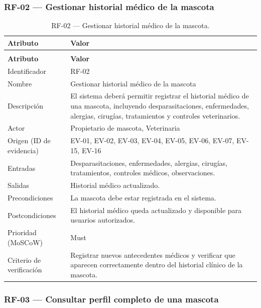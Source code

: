 \documentclass[journal,onecolumn]{IEEEtran}
\makeatletter
\newenvironment{atributos}[2]{%
	\small
	\begin{longtable}{@{}>{\raggedright\arraybackslash}p{4.2cm} >{\raggedright\arraybackslash}p{11.2cm}@{}}
		\caption{#2}\label{tab:#1}\\
		\toprule
		\textbf{Atributo} & \textbf{Valor} \\
		\midrule
		\endfirsthead
		\multicolumn{2}{@{}l}{\small\itshape (continuación)}\\
		\toprule
		\textbf{Atributo} & \textbf{Valor} \\
		\midrule
		\endhead
		\bottomrule
		\endlastfoot
	}{%
	\end{longtable}
	\normalsize
}
\makeatother
\begin{document}
	\subsubsection{RF-02 --- Gestionar historial médico de la mascota}
	
	\begin{atributos}{RF-02}{RF-02 --- Gestionar historial médico de la mascota.}
		Identificador & RF-02 \\
		Nombre & Gestionar historial médico de la mascota \\
		Descripción & El sistema deberá permitir registrar el historial médico de una mascota, incluyendo desparasitaciones, enfermedades, alergias, cirugías, tratamientos y controles veterinarios. \\
		Actor & Propietario de mascota, Veterinaria \\
		Origen (ID de evidencia) & EV-01, EV-02, EV-03, EV-04, EV-05, EV-06, EV-07, EV-15, EV-16 \\
		Entradas & Desparasitaciones, enfermedades, alergias, cirugías, tratamientos, controles médicos, observaciones. \\
		Salidas & Historial médico actualizado. \\
		Precondiciones & La mascota debe estar registrada en el sistema. \\
		Postcondiciones & El historial médico queda actualizado y disponible para usuarios autorizados. \\
		Prioridad (MoSCoW) & Must \\
		Criterio de verificación & Registrar nuevos antecedentes médicos y verificar que aparecen correctamente dentro del historial clínico de la mascota. \\
	\end{atributos}
	
	\subsubsection{RF-03 --- Consultar perfil completo de una mascota}
	
\end{document}
